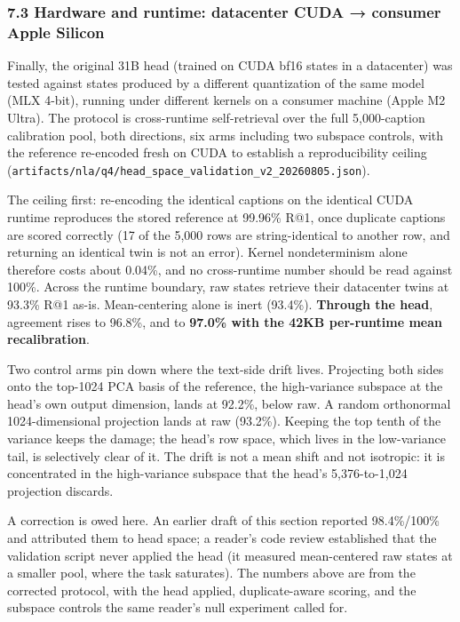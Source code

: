 \documentclass[
  11pt,
]{article}
\begin{document}
\subsubsection{7.3 Hardware and runtime: datacenter CUDA → consumer
Apple
Silicon}\label{hardware-and-runtime-datacenter-cuda-consumer-apple-silicon}

Finally, the original 31B head (trained on CUDA bf16 states in a
datacenter) was tested against states produced by a different
quantization of the same model (MLX 4-bit), running under different
kernels on a consumer machine (Apple M2 Ultra). The protocol is
cross-runtime self-retrieval over the full 5,000-caption calibration
pool, both directions, six arms including two subspace controls, with
the reference re-encoded fresh on CUDA to establish a reproducibility
ceiling
(\texttt{artifacts/nla/q4/head\_space\_validation\_v2\_20260805.json}).

The ceiling first: re-encoding the identical captions on the identical
CUDA runtime reproduces the stored reference at 99.96\% R@1, once
duplicate captions are scored correctly (17 of the 5,000 rows are
string-identical to another row, and returning an identical twin is not
an error). Kernel nondeterminism alone therefore costs about 0.04\%, and
no cross-runtime number should be read against 100\%. Across the runtime
boundary, raw states retrieve their datacenter twins at 93.3\% R@1
as-is. Mean-centering alone is inert (93.4\%). \textbf{Through the
head}, agreement rises to 96.8\%, and to \textbf{97.0\% with the 42KB
per-runtime mean recalibration}.

Two control arms pin down where the text-side drift lives. Projecting
both sides onto the top-1024 PCA basis of the reference, the
high-variance subspace at the head's own output dimension, lands at
92.2\%, below raw. A random orthonormal 1024-dimensional projection
lands at raw (93.2\%). Keeping the top tenth of the variance keeps the
damage; the head's row space, which lives in the low-variance tail, is
selectively clear of it. The drift is not a mean shift and not
isotropic: it is concentrated in the high-variance subspace that the
head's 5,376-to-1,024 projection discards.

A correction is owed here. An earlier draft of this section reported
98.4\%/100\% and attributed them to head space; a reader's code review
established that the validation script never applied the head (it
measured mean-centered raw states at a smaller pool, where the task
saturates). The numbers above are from the corrected protocol, with the
head applied, duplicate-aware scoring, and the subspace controls the
same reader's null experiment called for.
\end{document}
